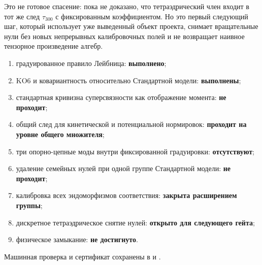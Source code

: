 Это не готовое спасение: пока не доказано, что тетраэдрический член входит
в тот же след $\tau_{300}$ с фиксированным коэффициентом. Но это первый
следующий шаг, который использует уже выведенный объект проекта, снимает
вращательные нули без новых непрерывных калибровочных полей и не возвращает
наивное тензорное произведение алгебр.

\begin{protocol}
\begin{enumerate}
 \item градуированное правило Лейбница:
 \textbf{выполнено};
 \item KO6 и ковариантность относительно Стандартной модели:
 \textbf{выполнены};
 \item стандартная кривизна суперсвязности как отображение момента:
 \textbf{не проходит};
 \item общий след для кинетической и потенциальной нормировок:
 \textbf{проходит на уровне общего множителя};
 \item три опорно-цепные моды внутри фиксированной градуировки:
 \textbf{отсутствуют};
 \item удаление семейных нулей при одной группе Стандартной модели:
 \textbf{не проходит};
 \item калибровка всех эндоморфизмов соответствия:
 \textbf{закрыта расширением группы};
 \item дискретное тетраэдрическое снятие нулей:
 \textbf{открыто для следующего гейта};
 \item физическое замыкание:
 \textbf{не достигнуто}.
\end{enumerate}
\end{protocol}

Машинная проверка и сертификат сохранены в
 и
.